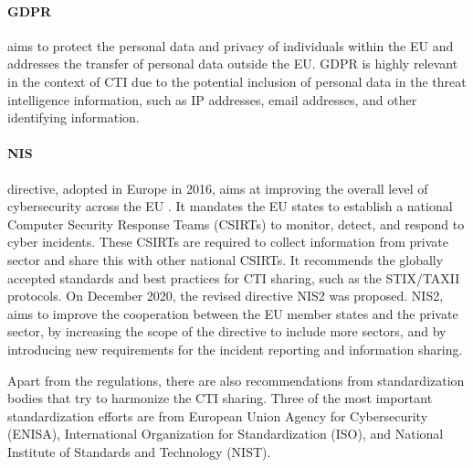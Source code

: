 \paragraph{GDPR} aims to protect the personal data and privacy of individuals within the EU and addresses the transfer of personal data outside the EU. GDPR is highly relevant in the context of CTI due to the potential inclusion of personal data in the threat intelligence information, such as IP addresses, email addresses, and other identifying information. 

\paragraph{NIS} directive, adopted in Europe in 2016, aims at improving the overall level of cybersecurity across the EU \cite{nis_directive}. It mandates the EU states to establish a national Computer Security Response Teams (CSIRTs) to monitor, detect, and respond to cyber incidents. These CSIRTs are required to collect information from private sector and share this with other national CSIRTs. It recommends the globally accepted standards and best practices for CTI sharing, such as the STIX/TAXII protocols. On December 2020, the revised directive NIS2 was proposed. NIS2, aims to improve the cooperation between the EU member states and the private sector, by increasing the scope of the directive to include more sectors, and by introducing new requirements for the incident reporting and information sharing.

Apart from the regulations, there are also recommendations from standardization bodies that try to harmonize the CTI sharing. Three of the most important standardization efforts are from European Union Agency for Cybersecurity (ENISA), International Organization for Standardization (ISO), and National Institute of Standards and Technology (NIST).

